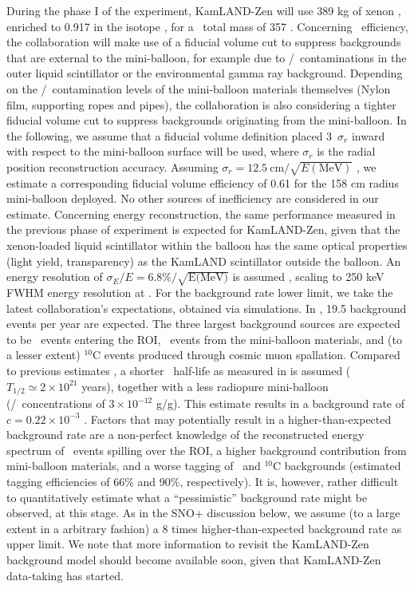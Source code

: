 During the phase I of the experiment, KamLAND-Zen will use 389 kg of xenon \cite{kozlov2011status}, enriched to 0.917 \cite{koga2010kamland} in the isotope \XE, for a \XE\ total mass of 357 \kgbb. Concerning \bbonu\ efficiency, the collaboration will make use of a fiducial volume cut to suppress backgrounds that are external to the mini-balloon, for example due to \URANIUM/\THORIUM\ contaminations in the outer liquid scintillator or the environmental gamma ray background. Depending on the \URANIUM/\THORIUM\ contamination levels of the mini-balloon materials themselves (Nylon film, supporting ropes and pipes), the collaboration is also considering a tighter fiducial volume cut to suppress backgrounds originating from the mini-balloon. In the following, we assume that a fiducial volume definition placed 3~$\sigma_r$ inward with respect to the mini-balloon surface will be used, where $\sigma_r$ is the radial position reconstruction accuracy. Assuming $\sigma_r=\mathrm{12.5~cm}/\sqrt{E\mathrm{(MeV)}}$ \cite{kozlov2011status}, we estimate a corresponding fiducial volume efficiency of 0.61 for the 158 cm radius mini-balloon deployed. No other sources of inefficiency are considered in our estimate. Concerning energy reconstruction, the same performance measured in the previous phase of experiment is expected for KamLAND-Zen, given that the xenon-loaded liquid scintillator within the balloon has the same optical properties (light yield, transparency) as the KamLAND scintillator outside the balloon. An energy resolution of $\sigma_E/E=6.8\%/\sqrt{\textrm{E(MeV)}}$ is assumed \cite{kozlov2011status}, scaling to 250 keV FWHM energy resolution at \Qbb. For the background rate lower limit, we take the latest collaboration's expectations, obtained via simulations. In \cite{kozlov2011status}, 19.5 background events per year are expected. The three largest background sources are expected to be \bbtnu\ events entering the ROI, \BI\ events from the mini-balloon materials, and (to a lesser extent) $^{10}\textrm{C}$ events produced through cosmic muon spallation. Compared to previous estimates \cite{koga2010kamland}, a shorter \bbtnu\ half-life as measured in \cite{EXO-200:2011xzf} is assumed ($T_{1/2}\simeq 2\times 10^{21}$ years), together with a less radiopure mini-balloon (\URANIUM/\THORIUM\ concentrations of $3\times 10^{-12}$ g/g). This estimate results in a background rate of $c=0.22\times 10^{-3}$ \ckkbby. Factors that may potentially result in a higher-than-expected background rate are a non-perfect knowledge of the reconstructed energy spectrum of \bbtnu\ events spilling over the ROI, a higher background contribution from mini-balloon materials, and a worse tagging of \BI\ and $^{10}\textrm{C}$ backgrounds (estimated tagging efficiencies of 66\% and 90\%, respectively). It is, however, rather difficult to quantitatively estimate what a ``pessimistic'' background rate might be observed, at this stage. As in the SNO+ discussion below, we assume (to a large extent in a arbitrary fashion) a 8 times higher-than-expected background rate as upper limit. We note that more information to revisit the KamLAND-Zen background model should become available soon, given that KamLAND-Zen data-taking has started.

